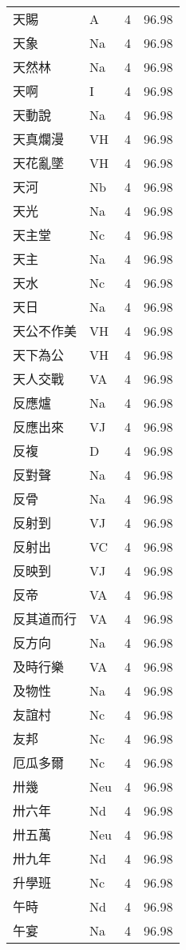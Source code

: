 \documentclass[twocolumn]{book}
\begin{document}
\begin{supertabular}{llrr}
天賜 & A & 4 &  96.98\\
天象 & Na & 4 &  96.98\\
天然林 & Na & 4 &  96.98\\
天啊 & I & 4 &  96.98\\
天動說 & Na & 4 &  96.98\\
天真爛漫 & VH & 4 &  96.98\\
天花亂墜 & VH & 4 &  96.98\\
天河 & Nb & 4 &  96.98\\
天光 & Na & 4 &  96.98\\
天主堂 & Nc & 4 &  96.98\\
天主 & Na & 4 &  96.98\\
天水 & Nc & 4 &  96.98\\
天日 & Na & 4 &  96.98\\
天公不作美 & VH & 4 &  96.98\\
天下為公 & VH & 4 &  96.98\\
天人交戰 & VA & 4 &  96.98\\
反應爐 & Na & 4 &  96.98\\
反應出來 & VJ & 4 &  96.98\\
反複 & D & 4 &  96.98\\
反對聲 & Na & 4 &  96.98\\
反骨 & Na & 4 &  96.98\\
反射到 & VJ & 4 &  96.98\\
反射出 & VC & 4 &  96.98\\
反映到 & VJ & 4 &  96.98\\
反帝 & VA & 4 &  96.98\\
反其道而行 & VA & 4 &  96.98\\
反方向 & Na & 4 &  96.98\\
及時行樂 & VA & 4 &  96.98\\
及物性 & Na & 4 &  96.98\\
友誼村 & Nc & 4 &  96.98\\
友邦 & Nc & 4 &  96.98\\
厄瓜多爾 & Nc & 4 &  96.98\\
卅幾 & Neu & 4 &  96.98\\
卅六年 & Nd & 4 &  96.98\\
卅五萬 & Neu & 4 &  96.98\\
卅九年 & Nd & 4 &  96.98\\
升學班 & Nc & 4 &  96.98\\
午時 & Nd & 4 &  96.98\\
午宴 & Na & 4 &  96.98\\

\end{supertabular}
\end{document}
